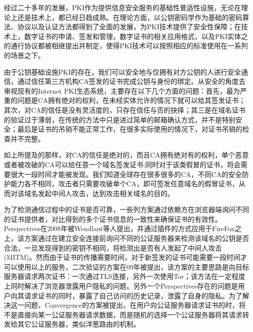 经过二十多年的发展，PKI作为提供信息安全服务的基础性普适性设施，无论在理论上还是技术上，都已经日趋成熟。在理论方面，以公钥密码学作为基础的密码算法、协议以及认证方法都得到了全面的发展，为PKI技术提供了安全性保障；在技术上，数字证书的申请、签发和管理，数字证书的相关应用格式，以及PKI实体之的通行协议都被相继提出并制定，使得PKI技术可以按照相应的标准使用在一系列的场景之下。


由于公钥基础设施PKI的存在，我们可以安全地与仅拥有对方公钥的人进行安全通信，通过信任第三方机构CA签发的证书完成公钥与身份的绑定。从安全的角度去审视现有的Internet PKI生态系统，主要存在以下几个方面的问题：首先，最为严重的问题是CA拥有绝对的权利，在未经实体允许的情况下就可以给其签发证书；其次，对CA的信任是没有灵活度的，只存在信任与否的抉择；其三是在域名证书的验证过于薄弱，在传统的方法中只是进过简单的邮箱确认方式，并不是特别安全；最后是证书的吊销不能正常工作，在很多实际使用的情况下，对证书吊销的检查并不完整\cite{ristic2014bulletproof}。

如上所提及的那样，对CA的信任是绝对的，而且CA拥有绝对有的权利，单个恶意或者被攻破的CA可以给任意一个域名签发证书\cite{ducklin2013turktrust};同时对于该类假冒的证书，将会需要很大一段时间才能被发现。我们知道全球存在很多很多的CA，不同CA的安全防护能力各不相同，攻击者只需要攻破单个CA，即可签发任意域名的假冒证书，从而对该域名发起中间人攻击，达到攻击相关域名的目的。





为了检测通信过程中的证书是否可靠，一些列方案通过依赖方在浏览器端询问不同的证书提供者，对比得到的多个证书信息的一致性来确保证书的有效性。Perspectives\cite{wendlandt2008perspectives}在2008年被Wendlant等人提出，并通过插件的方式应用于FireFox之上，该方案通过在建立安全连接前询问不同的公证服务器来检测该域名的公钥是否合法，一旦发现得到的密钥不相同，将检测出是否有人发起了中间人攻击(MITM)。然而由于证书的传播需要时间，对于新签发的证书可能需要一段时间才可以使用以上的服务，二次验证\cite{alicherry2009doublecheck}的方案在09年被提出，该方案的主要思路是向目标服务器请求两次证书：一次通过TLS连接，另外一次使用Tor\cite{alicherry2009doublecheck}；该方法在一定程度上同时解决了浏览器泄露用户隐私的问题。另外一个Perspectives存在的问题是用户向其请求证书的同时，暴露了自己访问的历史记录，泄露了自身的隐私。为了解决这一问题，Convergence\cite{convergence}的方案被提出，在用户向公证服务器请求证书的时，将不是直接向某一公证服务器请求数据，而是随机的选择一个公证服务器将其请求转发给其它公证服务器，类似洋葱路由的机制。

